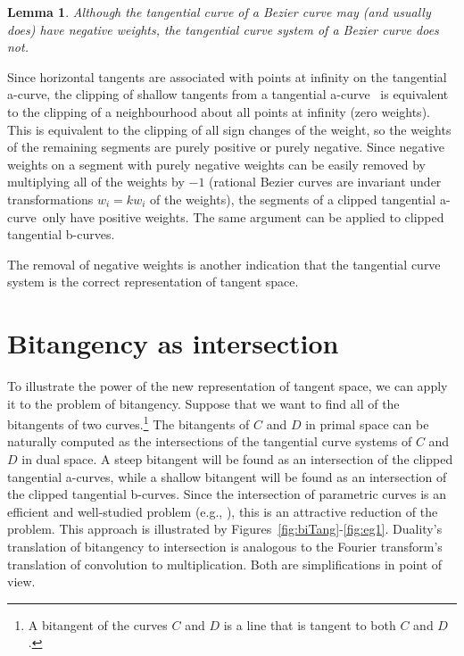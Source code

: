 \documentclass[12pt]{article}
\newcommand{\QED}{\vrule height 1.4ex width 1.0ex depth -.1ex\ \vspace{.3in}} %
\newcommand{\prf}{\noindent{{\bf Proof}:\ \ \ }}
\newtheorem{lemma}[theorem]{Lemma}
\newcommand{\atang}{tangential a-curve\ }
\begin{document}
\begin{lemma}
Although the tangential curve of a Bezier curve may (and usually does) have
negative weights,
the tangential curve system of a Bezier curve does not.
\end{lemma}
\prf
Since horizontal tangents are associated with points at infinity on the
tangential a-curve, the clipping of shallow tangents from a \atang 
is equivalent to the clipping 
of a neighbourhood about all points at infinity (zero weights).
This is equivalent to the clipping of all sign changes of the weight,
so the weights of the remaining segments are purely positive or purely negative.  
Since negative weights on a segment with purely negative weights can be easily
removed by multiplying all of the weights by $-1$ (rational Bezier curves 
are invariant under transformations $w_i = kw_i$ of the weights),
the segments of a clipped \atang only have positive weights.
The same argument can be applied to clipped tangential b-curves.
\QED

The removal of negative weights is another indication that the tangential curve
system is the correct representation of tangent space.


\section{Bitangency as intersection}
\label{sec:bitang}

To illustrate the power of the new representation of tangent space,
we can apply it to the problem of bitangency.
Suppose that we want to find all of the bitangents of two curves.\footnote{A bitangent
	of the curves $C$ and $D$ is a line that is tangent to 
	both $C$ and $D$.}
The bitangents of $C$ and $D$ in primal space can be naturally computed as
the intersections of the tangential curve systems of $C$ and $D$ in dual space.
A steep bitangent will be found as an
intersection of the clipped tangential a-curves, while a shallow bitangent
will be found as an intersection of the clipped tangential b-curves.
Since the intersection of parametric curves is an efficient and well-studied problem
(e.g., \cite{sederberg86}),
this is an attractive reduction of the problem.
This approach is illustrated by Figures~\ref{fig:biTang}-\ref{fig:eg1}.
Duality's translation of bitangency to intersection
is analogous to the Fourier transform's translation of convolution to multiplication.
Both are simplifications in point of view.
\end{document}

